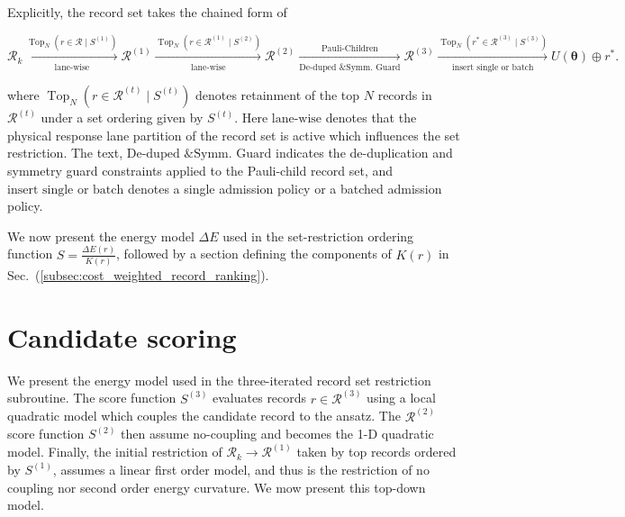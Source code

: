 \documentclass[
  reprint,
  amsmath,
  amssymb,
  aps,
  pra,
  nofootinbib,
  superscriptaddress,
  floatfix
]{revtex4-2}
\begin{document}
Explicitly, the record set takes the chained form of

\(\mathcal R_k
\xrightarrow[\text{lane-wise}]{\operatorname{Top}_N{(r\in\mathcal R \mid S^{(1)})}}
\mathcal R^{(1)}
\xrightarrow[\text{lane-wise}]{\operatorname{Top}_N{(r\in\mathcal R^{(1)} \mid S^{(2)})}}
\mathcal R^{(2)}
\xrightarrow[\text{De-duped \& Symm. Guard}]{\operatorname{Pauli-Children}}
\mathcal R^{(3)}
\xrightarrow[\text{insert single or batch}]{\operatorname{Top}_N{(r^*\in\mathcal R^{(3)} \mid S^{(3)})}}
U(\boldsymbol \theta) \oplus r^*.\)

 where $\operatorname{Top}_N{(r\in\mathcal R^{(t)} \mid S^{(t)})}$ denotes retainment of the top $N$ records in $\mathcal R^{(t)}$ under a set ordering given by $S^{(t)}$. Here $\text{lane-wise}$ denotes that the physical response lane partition of the record set is active which influences the set restriction. The text, $\text{De-duped \& Symm. Guard}$ indicates the de-duplication and symmetry guard constraints applied to the Pauli-child record set,  and $\text{insert single or batch}$ denotes a single admission policy or a batched admission policy.

 We now present the energy model $\Delta E$ used in the set-restriction ordering function $S=\frac {\Delta E(r)} {K(r)}$, followed by a section defining the components of $K(r)$ in Sec.~(\ref{subsec:cost_weighted_record_ranking}).

\section{Candidate scoring}
\label{subsec:candidate_energy_models}
%
We present the energy model used in the three-iterated record set restriction subroutine. The score function $S^{(3)}$ evaluates records $r\in\mathcal R^{(3)}$ using a local quadratic model which couples the candidate record to the ansatz. The $\mathcal R^{(2)}$ score function $S^{(2)}$ then assume no-coupling and becomes the 1-D quadratic model. Finally, the initial restriction of $\mathcal R_k \to \mathcal R^{(1)}$ taken by top records ordered by $S^{(1)}$, assumes a linear first order model, and thus is the restriction of no coupling nor second order energy curvature. We mow present this top-down model.
\end{document}
